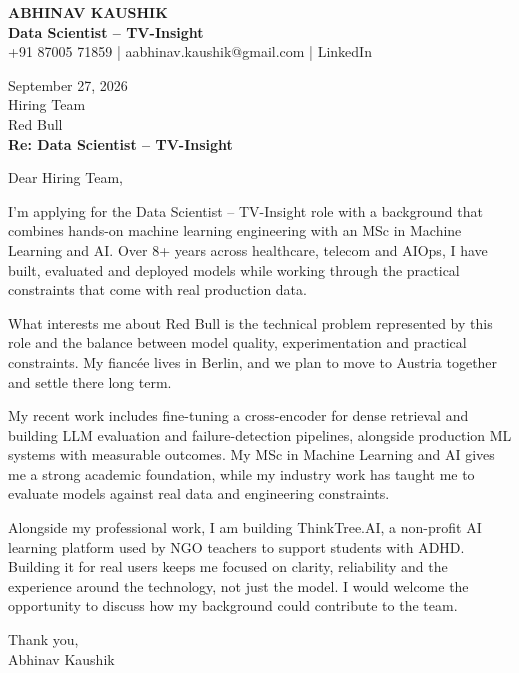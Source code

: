 \documentclass[10pt,a4paper]{article}
\begin{document}
\begin{center}
{\Large\bfseries ABHINAV KAUSHIK}\\[2pt]
{\bfseries Data Scientist – TV-Insight}\\[2pt]
+91 87005 71859 \quad | \quad aabhinav.kaushik@gmail.com \quad | \quad LinkedIn
\end{center}
\vspace{8pt}
September 27, 2026\\[6pt]
Hiring Team\\
Red Bull\\[4pt]
\textbf{Re: Data Scientist – TV-Insight}

Dear Hiring Team,

I’m applying for the Data Scientist – TV-Insight role with a background that combines hands-on machine learning engineering with an MSc in Machine Learning and AI. Over 8+ years across healthcare, telecom and AIOps, I have built, evaluated and deployed models while working through the practical constraints that come with real production data.

What interests me about Red Bull is the technical problem represented by this role and the balance between model quality, experimentation and practical constraints. My fiancée lives in Berlin, and we plan to move to Austria together and settle there long term.

My recent work includes fine-tuning a cross-encoder for dense retrieval and building LLM evaluation and failure-detection pipelines, alongside production ML systems with measurable outcomes. My MSc in Machine Learning and AI gives me a strong academic foundation, while my industry work has taught me to evaluate models against real data and engineering constraints.

Alongside my professional work, I am building ThinkTree.AI, a non-profit AI learning platform used by NGO teachers to support students with ADHD. Building it for real users keeps me focused on clarity, reliability and the experience around the technology, not just the model. I would welcome the opportunity to discuss how my background could contribute to the team.

Thank you,\\
Abhinav Kaushik
\end{document}
